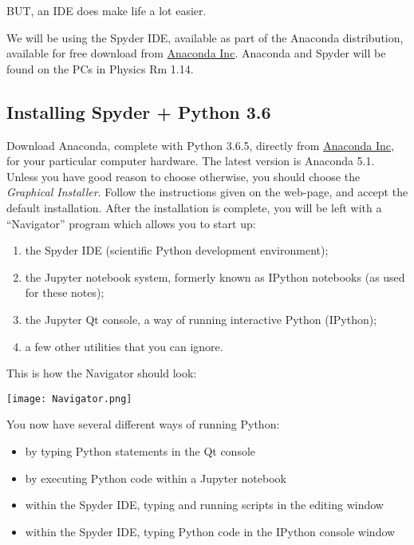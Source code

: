 \documentclass[10pt]{article}
\makeatletter
\def\maxwidth{\ifdim\Gin@nat@width>\linewidth\linewidth
    \else\Gin@nat@width\fi}
\providecommand{\tightlist}{%
      \setlength{\itemsep}{0pt}\setlength{\parskip}{0pt}}
\makeatother
\begin{document}
BUT, an IDE does make life a lot easier.

We will be using the Spyder IDE, available as part of the Anaconda
distribution, available for free download from
\href{https://www.anaconda.com/downloads}{Anaconda Inc}. Anaconda and
Spyder will be found on the PCs in Physics Rm 1.14.

    \hypertarget{installing-spyder-python-3.6}{%
\subsection{Installing Spyder + Python
3.6}\label{installing-spyder-python-3.6}}

Download Anaconda, complete with Python 3.6.5, directly from
\href{https://www.anaconda.com/downloads}{Anaconda Inc}, for your
particular computer hardware. The latest version is Anaconda 5.1. Unless
you have good reason to choose otherwise, you should choose the
\emph{Graphical Installer}. Follow the instructions given on the
web-page, and accept the default installation. After the installation is
complete, you will be left with a ``Navigator'' program which allows you
to start up:

\begin{enumerate}
\def\labelenumi{\arabic{enumi}.}
\tightlist
\item
  the Spyder IDE (scientific Python development environment);
\item
  the Jupyter notebook system, formerly known as IPython notebooks (as
  used for these notes);
\item
  the Jupyter Qt console, a way of running interactive Python (IPython);
\item
  a few other utilities that you can ignore.
\end{enumerate}

This is how the Navigator should look:

\texttt{[image: Navigator.png]}

You now have several different ways of running Python:

\begin{itemize}
\tightlist
\item
  by typing Python statements in the Qt console
\item
  by executing Python code within a Jupyter notebook
\item
  within the Spyder IDE, typing and running scripts in the editing
  window
\item
  within the Spyder IDE, typing Python code in the IPython console
  window
\end{itemize}
\end{document}
